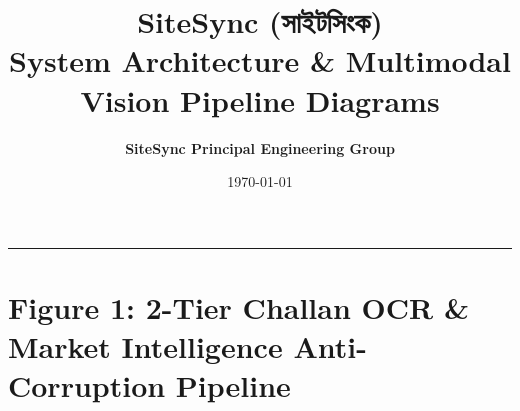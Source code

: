 \documentclass[11pt,a4paper]{article}
\begin{document}
\title{\textbf{\LARGE SiteSync (সাইটসিংক)}\\[0.3em]
\large System Architecture \& Multimodal Vision Pipeline Diagrams}
\author{\textbf{SiteSync Principal Engineering Group}}
\date{\today}
\maketitle

\vspace{1em}
\hrule
\vspace{1.5em}

\section*{Figure 1: 2-Tier Challan OCR \& Market Intelligence Anti-Corruption Pipeline}
\end{document}
